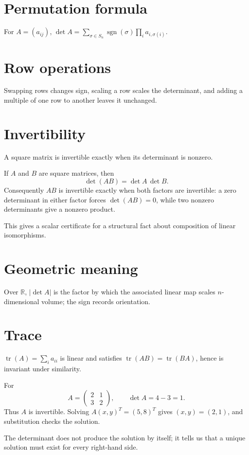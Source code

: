 \section{Permutation formula}
For $A=(a_{ij})$, $\det A=\sum_{\sigma\in S_n}\operatorname{sgn}(\sigma)\prod_i a_{i,\sigma(i)}$.

\section{Row operations}
Swapping rows changes sign, scaling a row scales the determinant, and adding a multiple of one row to another leaves it unchanged.

\section{Invertibility}
A square matrix is invertible exactly when its determinant is nonzero.


\begin{example}\label{ex:i08-expand-02}
If \(A\) and \(B\) are square matrices, then
\[
\det(AB)=\det A\,\det B.
\]
Consequently \(AB\) is invertible exactly when both factors are invertible:
a zero determinant in either factor forces \(\det(AB)=0\), while two nonzero
determinants give a nonzero product.

This gives a scalar certificate for a structural fact about composition of
linear isomorphisms.
\end{example}
\section{Geometric meaning}
Over $\mathbb R$, $|\det A|$ is the factor by which the associated linear map scales $n$-dimensional volume; the sign records orientation.

\section{Trace}
$\operatorname{tr}(A)=\sum_i a_{ii}$ is linear and satisfies $\operatorname{tr}(AB)=\operatorname{tr}(BA)$, hence is invariant under similarity.


\begin{example}\label{ex:i08-expand-01}
For
\[
A=\begin{pmatrix}2&1\\3&2\end{pmatrix},
\qquad
\det A=4-3=1.
\]
Thus \(A\) is invertible. Solving
\(A(x,y)^T=(5,8)^T\) gives \((x,y)=(2,1)\), and substitution checks the
solution.

The determinant does not produce the solution by itself; it tells us that a
unique solution must exist for every right-hand side.
\end{example}

